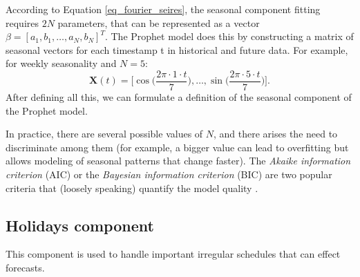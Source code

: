 According to Equation \ref{eq_fourier_seires}, the seasonal component fitting requires $2N$ parameters, that can be represented as a vector $\beta = [a_1, b_1, \ldots, a_N, b_N]^T$. The Prophet model does this by constructing a matrix of seasonal vectors for each timestamp t in historical and future data. For example, for weekly seasonality and $N = 5$: \begin{equation}
    \mathbf{X}(t) = \bigg[\cos\bigg(\frac{2\pi \cdot 1 \cdot t}{7}\bigg), \ldots, \sin\bigg(\frac{2\pi \cdot 5 \cdot t}{7}\bigg)\bigg].
\end{equation} After defining all this, we can formulate a definition of the seasonal component of the Prophet model.


In practice, there are several possible values of $N$, and there arises the need to discriminate among them (for example, a bigger value can lead to overfitting but allows modeling of seasonal patterns that change faster). The \textit{Akaike information criterion} (AIC)  or the \textit{Bayesian information criterion} (BIC) are two popular criteria that (loosely speaking) quantify the model quality \cite{doi:10.1177/0049124104268644}.

\subsection{Holidays component}

This component is used to handle important irregular schedules that can effect forecasts.

